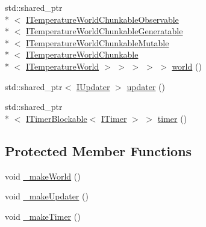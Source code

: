 \begin{DoxyCompactItemize}
\item 
std\-::shared\-\_\-ptr\\*
$<$ \hyperlink{class_i_temperature_world_chunkable_observable}{I\-Temperature\-World\-Chunkable\-Observable}\\*
$<$ \hyperlink{class_i_temperature_world_chunkable_generatable}{I\-Temperature\-World\-Chunkable\-Generatable}\\*
$<$ \hyperlink{class_i_temperature_world_chunkable_mutable}{I\-Temperature\-World\-Chunkable\-Mutable}\\*
$<$ \hyperlink{class_i_temperature_world_chunkable}{I\-Temperature\-World\-Chunkable}\\*
$<$ \hyperlink{class_i_temperature_world}{I\-Temperature\-World} $>$ $>$ $>$ $>$ $>$ \hyperlink{class_scaling_generatable_chunked_temperature_world_injector_a370a3290c83d357760662b5c63183d5b}{world} ()
\item 
std\-::shared\-\_\-ptr$<$ \hyperlink{class_i_updater}{I\-Updater} $>$ \hyperlink{class_scaling_generatable_chunked_temperature_world_injector_a75cd417c40bef43ead32acd6b4527770}{updater} ()
\item 
std\-::shared\-\_\-ptr\\*
$<$ \hyperlink{class_i_timer_blockable}{I\-Timer\-Blockable}$<$ \hyperlink{class_i_timer}{I\-Timer} $>$ $>$ \hyperlink{class_scaling_generatable_chunked_temperature_world_injector_a9ad4c32579a542181f67aedc8bd664e2}{timer} ()
\end{DoxyCompactItemize}
\subsection*{Protected Member Functions}
\begin{DoxyCompactItemize}
\item 
void \hyperlink{class_scaling_generatable_chunked_temperature_world_injector_ad912439ee80b88cd6e879940be8d59d1}{\-\_\-make\-World} ()
\item 
void \hyperlink{class_scaling_generatable_chunked_temperature_world_injector_afb89e6cd1af2754864ff17f2b21f1e97}{\-\_\-make\-Updater} ()
\item 
void \hyperlink{class_scaling_generatable_chunked_temperature_world_injector_a25fb5d4991bba7dc59a9134225761827}{\-\_\-make\-Timer} ()
\end{DoxyCompactItemize}
